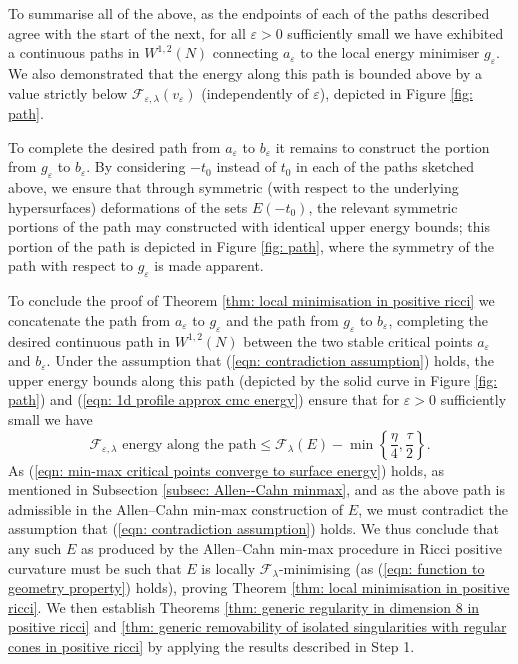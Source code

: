 \documentclass[11pt]{article}
\begin{document}
\bigskip

To summarise all of the above, as the endpoints of each of the paths described agree with the start of the next, for all $\varepsilon > 0$ sufficiently small we have exhibited a continuous paths in $W^{1,2}(N)$ connecting $a_\varepsilon$ to the local energy minimiser $g_\varepsilon$. We also demonstrated that the energy along this path is bounded above by a value strictly below $\mathcal{F}_{\varepsilon,\lambda}(v_\varepsilon)$ (independently of $\varepsilon$), depicted in Figure \ref{fig: path}.

\bigskip

To complete the desired path from $a_\varepsilon$ to $b_\varepsilon$ it remains to construct the portion from $g_\varepsilon$ to $b_\varepsilon$. By considering $-t_0$ instead of $t_0$ in each of the paths sketched above, we ensure that through symmetric (with respect to the underlying hypersurfaces) deformations of the sets $E(-t_0)$, the relevant symmetric portions of the path may constructed with identical upper energy bounds; this portion of the path is depicted in Figure \ref{fig: path}, where the symmetry of the path with respect to $g_\varepsilon$ is made apparent.

\bigskip

To conclude the proof of Theorem \ref{thm: local minimisation in positive ricci} we concatenate the path from $a_\varepsilon$ to $g_\varepsilon$ and the path from $g_\varepsilon$ to $b_\varepsilon$, completing the desired continuous path in $W^{1,2}(N)$ between the two stable critical points $a_\varepsilon$ and $b_\varepsilon$. Under the assumption that (\ref{eqn: contradiction assumption}) holds, the upper energy bounds along this path (depicted by the solid curve in Figure \ref{fig: path}) and (\ref{eqn: 1d profile approx cmc energy}) ensure that for $\varepsilon > 0$ sufficiently small we have
\begin{equation*}
    \text{$\mathcal{F}_{\varepsilon,\lambda}$ energy along the path} \leq \mathcal{F}_\lambda(E) - \min\left\{\frac{\eta}{4},\frac{\tau}{2} \right\}.
\end{equation*}
As (\ref{eqn: min-max critical points converge to surface energy}) holds, as mentioned in Subsection \ref{subsec: Allen--Cahn minmax}, and as the above path is admissible in the Allen--Cahn min-max construction of $E$, we must contradict the assumption that (\ref{eqn: contradiction assumption}) holds. We thus conclude that any such $E$ as produced by the Allen--Cahn min-max procedure in Ricci positive curvature must be such that $E$ is locally $\mathcal{F}_\lambda$-minimising (as (\ref{eqn: function to geometry property}) holds), proving Theorem \ref{thm: local minimisation in positive ricci}. We then establish Theorems \ref{thm: generic regularity in dimension 8 in positive ricci} and \ref{thm: generic removability of isolated singularities with regular cones in positive ricci} by applying the results described in Step 1.
\end{document}
